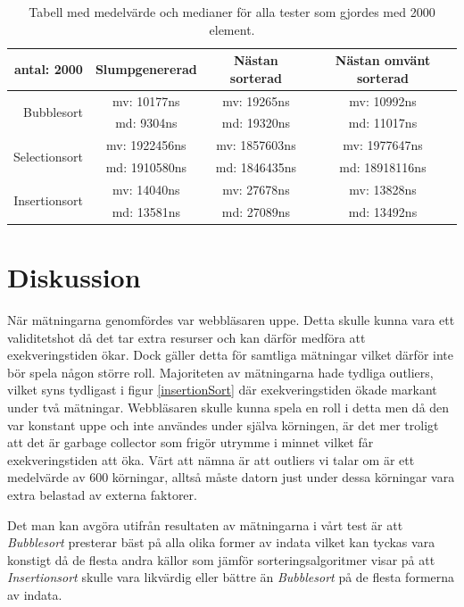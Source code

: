 \documentclass[a4paper]{article}
\begin{document}
\begin{table}[H]
	\begin{tabular}{r|c|c|c|}
		antal: 2000 & Slumpgenererad & Nästan sorterad & Nästan omvänt sorterad \\ \hline
		\multirow{2}{*}{Bubblesort}    & mv: 10177ns & mv: 19265ns & mv: 10992ns \\
		                               & md: 9304ns & md: 19320ns & md: 11017ns \\ \hline
		\multirow{2}{*}{Selectionsort} & mv: 1922456ns & mv: 1857603ns & mv: 1977647ns \\
		                               & md: 1910580ns & md: 1846435ns & md: 18918116ns \\ \hline
		\multirow{2}{*}{Insertionsort} & mv: 14040ns & mv: 27678ns & mv: 13828ns \\
		                               & md: 13581ns & md: 27089ns & md: 13492ns \\ \hline	
	\end{tabular}
	\caption{Tabell med medelvärde och medianer för alla tester som gjordes med 2000 element.}
	\label{Tabel2000}
\end{table}

\section{Diskussion}
När mätningarna genomfördes var webbläsaren uppe. Detta skulle kunna vara ett validitetshot då det tar extra resurser och kan därför medföra att exekveringstiden ökar. Dock gäller detta för samtliga mätningar vilket därför inte bör spela någon större roll. Majoriteten av mätningarna hade tydliga outliers, vilket syns tydligast i figur \ref{insertionSort} där exekveringstiden ökade markant under två mätningar. Webbläsaren skulle kunna spela en roll i detta men då den var konstant uppe och inte användes under själva körningen, är det mer troligt att det är garbage collector som frigör utrymme i minnet vilket får exekveringstiden att öka. Värt att nämna är att outliers vi talar om är ett medelvärde av 600 körningar, alltså måste datorn just under dessa körningar vara extra belastad av externa faktorer.

Det man kan avgöra utifrån resultaten av mätningarna i vårt test är att \emph{Bubblesort} presterar bäst på alla olika former av indata vilket kan tyckas vara konstigt då de flesta andra källor som jämför sorteringsalgoritmer visar på att \emph{Insertionsort} skulle vara likvärdig eller bättre än \emph{Bubblesort} på de flesta formerna av indata.
\end{document}
